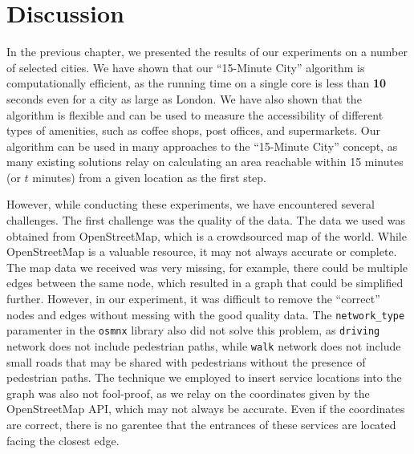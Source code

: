\chapter{Discussion} \label{discussion}

In the previous chapter, we presented the results of our experiments on a number of selected cities. We have shown that our ``15-Minute City'' algorithm is computationally efficient, as the running time on a single core is less than \textbf{10} seconds even for a city as large as London. We have also shown that the algorithm is flexible and can be used to measure the accessibility of different types of amenities, such as coffee shops, post offices, and supermarkets. Our algorithm can be used in many approaches to the ``15-Minute City'' concept, as many existing solutions relay on calculating an area reachable within 15 minutes (or $t$ minutes) from a given location as the first step. 

However, while conducting these experiments, we have encountered several challenges. The first challenge was the quality of the data. The data we used was obtained from OpenStreetMap, which is a crowdsourced map of the world. While OpenStreetMap is a valuable resource, it may not always accurate or complete. The map data we received was very missing, for example, there could be multiple edges between the same node, which resulted in a graph that could be simplified further. However, in our experiment, it was difficult to remove the ``correct'' nodes and edges without messing with the good quality data. The \verb|network_type| paramenter in the \verb|osmnx| library also did not solve this problem, as \verb|driving| network does not include pedestrian paths, while \verb|walk| network does not include small roads that may be shared with pedestrians without the presence of pedestrian paths. The technique we employed to insert service locations into the graph was also not fool-proof, as we relay on the coordinates given by the OpenStreetMap API, which may not always be accurate. Even if the coordinates are correct, there is no garentee that the entrances of these services are located facing the closest edge. 

